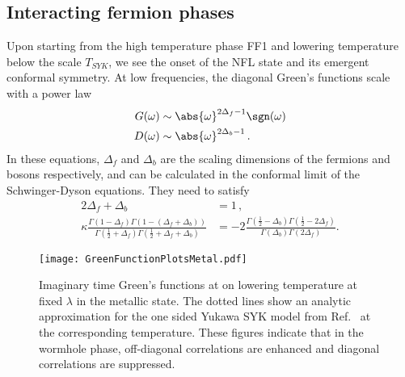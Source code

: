 \subsection{Interacting fermion phases}
Upon starting from the high temperature phase FF1 and lowering temperature below the scale $T_{SYK}$, we see the onset of the NFL state and its emergent conformal symmetry. At low frequencies, the diagonal Green's functions scale with a power law 
\begin{align}
    G(\omega) &\sim \abs{\omega}^{2\Delta_f-1}\sgn(\omega) \\
    D(\omega) &\sim \abs{\omega}^{2\Delta_b-1} \,.
    \label{eq:scalingsolns}
\end{align}
In these equations, $\Delta_f$ and $\Delta_b$ are the scaling dimensions of the fermions and bosons respectively, and can be calculated in the conformal limit of the Schwinger-Dyson equations. They need to satisfy
\begin{align}
    2\Delta_f + \Delta_b &= 1 \, ,\\
    \kappa\frac{\Gamma(1-\Delta_f)\Gamma(1-(\Delta_f+\Delta_b))}{\Gamma(\frac{1}{2}+\Delta_f)\Gamma(\frac{1}{2}+\Delta_f+\Delta_b)} &= -2 \frac{\Gamma(\frac{1}{2}-\Delta_b)\Gamma(\frac{1}{2}-2\Delta_f)}{\Gamma(\Delta_b)\Gamma(2\Delta_f)} .
\end{align}
%
\begin{figure}[h]
    \centering
    \texttt{[image: GreenFunctionPlotsMetal.pdf]}
    \caption{Imaginary time Green's functions at on lowering temperature at fixed $\lambda$ in the metallic state. The dotted lines show an analytic approximation for the one sided Yukawa SYK model from Ref.~\cite{esterlis2019cooper} at the corresponding temperature. These figures indicate that in the wormhole phase, off-diagonal correlations are enhanced and diagonal correlations are suppressed.}
    \label{fig:GreenFunctionPlotsMetal}
\end{figure}

